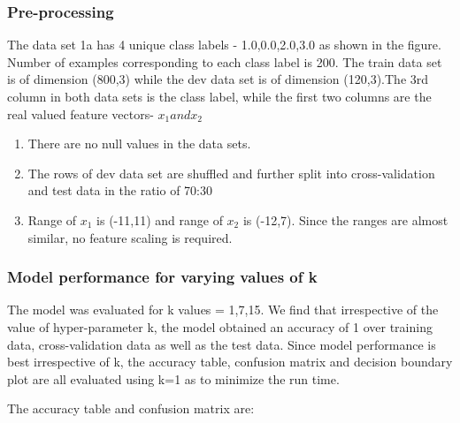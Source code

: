 \documentclass[11pt,a4paper]{article}
\newcommand{\noi}{\noindent}
\begin{document}
\subsubsection{Pre-processing}

The data set 1a has 4 unique class labels - {1.0,0.0,2.0,3.0} as shown in the figure. Number of examples corresponding to each class label is 200.
The train data set is of dimension (800,3) while the dev data set is of dimension (120,3).The 3rd column in both data sets is the class label, while the first two columns are the real valued feature vectors- $x_{1} and x_{2}$
\begin{enumerate}
    \item There are no null values in the data sets. 
    \item The rows of dev data set are shuffled and further split into cross-validation and test data in the ratio of 70:30
    \item Range of $x_1$ is (-11,11) and range of $x_2$ is (-12,7). Since the ranges are almost similar, no feature scaling is required.  
\end{enumerate}

\subsubsection{Model performance for varying values of k}
The model was evaluated for k values = {1,7,15}. We find that irrespective of the value of hyper-parameter k, the model obtained an accuracy of 1 over training data, cross-validation data as well as the test data. Since model performance is best irrespective of k, the accuracy table, confusion matrix and decision boundary plot are all evaluated using k=1 as to minimize the run time.

\noi
The accuracy table and confusion matrix are: 

\end{document}
